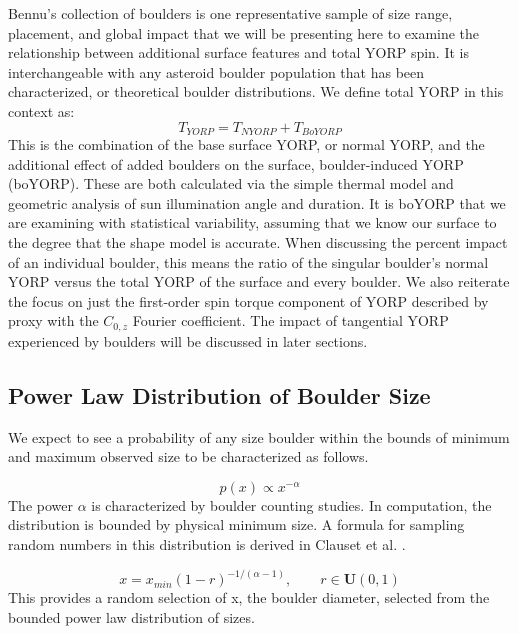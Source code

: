 Bennu's collection of boulders is one representative sample of size range, placement, and global impact that we will be presenting here to examine the relationship between additional surface features and total YORP spin. It is interchangeable with any asteroid boulder population that has been characterized, or theoretical boulder distributions. We define total YORP in this context as:
\begin{equation}
    T_{YORP} = T_{NYORP} + T_{BoYORP}
    \label{eq:ugh}
\end{equation}
This is the combination of the base surface YORP, or normal YORP, and the additional effect of added boulders on the surface, boulder-induced YORP (boYORP). These are both calculated via the simple thermal model and geometric analysis of sun illumination angle and duration. It is boYORP that we are examining with statistical variability, assuming that we know our surface to the degree that the shape model is accurate. When discussing the percent impact of an individual boulder, this means the ratio of the singular boulder's normal YORP versus the total YORP of the surface and every boulder. We also reiterate the focus on just the first-order spin torque component of YORP described by proxy with the $C_{0,z}$ Fourier coefficient. The impact of tangential YORP experienced by boulders will be discussed in later sections. 


\subsection{Power Law Distribution of Boulder Size}
We expect to see a probability of any size boulder within the bounds of minimum and maximum observed size to be characterized as follows. 

\begin{equation}
    p(x) \propto x^{-\alpha}
\end{equation}
The power $\alpha$ is characterized by boulder counting studies. In computation, the distribution is bounded by physical minimum size. A formula for sampling random numbers in this distribution is derived in Clauset et al. \citep{Clauset2009}.

\begin{equation}
    x = x_{min}(1-r)^{-1/(\alpha-1)},\qquad r \in \mathbf{U}(0,1)
\end{equation}
This provides a random selection of x, the boulder diameter, selected from the bounded power law distribution of sizes. 


